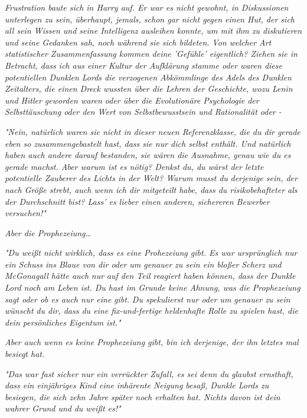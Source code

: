 {\emph{Frustration baute sich in Harry auf. Er war es nicht gewohnt, in Diskussionen unterlegen zu sein, überhaupt, jemals, schon gar nicht gegen einen Hut, der sich all sein Wissen und seine Intelligenz ausleihen konnte, um mit ihm zu diskutieren und seine Gedanken sah, noch während sie sich bildeten.} \emph{\emph{Von welcher Art statistischer Zusammenfassung kommen deine 'Gefühle' eigentlich? Ziehen sie in Betracht, dass ich aus einer Kultur der Aufklärung stamme oder waren diese potentiellen Dunklen Lords die verzogenen Abkömmlinge des Adels des Dunklen Zeitalters, die einen Dreck wussten über die Lehren der Geschichte, wozu Lenin und Hitler geworden waren oder über die Evolutionäre Psychologie der Selbsttäuschung oder den Wert von Selbstbewusstsein und Rationalität oder -}}

\emph{"Nein, natürlich waren sie nicht in dieser neuen Referenzklasse, die du dir gerade eben so zusammengebastelt hast, dass sie nur dich selbst enthält. Und natürlich haben auch andere darauf bestanden, sie wären die} \emph{Ausnahme, genau wie du es gerade machst. Aber warum ist es nötig? Denkst du, du wärst der letzte potentielle Zauberer des Lichts in der Welt? Warum musst} \emph{du} \emph{\emph{derjenige sein, der nach Größe strebt, auch wenn ich dir mitgeteilt habe, dass du risikobehafteter als der Durchschnitt bist? Lass' es lieber einen anderen, sichereren Bewerber versuchen!"}}

\emph{Aber die Prophezeiung…}

\emph{"Du weißt nicht wirklich, dass es eine Prohezeiung gibt. Es war ursprünglich nur ein Schuss ins Blaue von dir oder um genauer zu sein ein bloßer Scherz und McGonagall hätte auch} \emph{nur} \emph{auf den Teil reagiert haben können, dass der Dunkle Lord noch am Leben ist. Du hast im Grunde keine Ahnung, was die Prophezeiung sagt oder ob es auch nur eine} \emph{gibt.} \emph{\emph{Du spekulierst nur oder um genauer zu sein}} \emph{wünscht} \emph{\emph{du dir, dass du eine fix-und-fertige heldenhafte Rolle zu spielen hast, die dein persönliches Eigentum ist."}}

\emph{Aber auch wenn es keine Prophezeiung gibt, bin ich derjenige, der ihn letztes mal besiegt hat.}

\emph{"Das war fast sicher nur ein verrückter Zufall, es sei denn du glaubst ernsthaft, dass ein einjähriges Kind eine inhärente Neigung besaß, Dunkle Lords zu besiegen, die sich zehn Jahre später noch erhalten hat. Nichts davon ist dein wahrer Grund und} \emph{du weißt es!\emph{"}}

}
